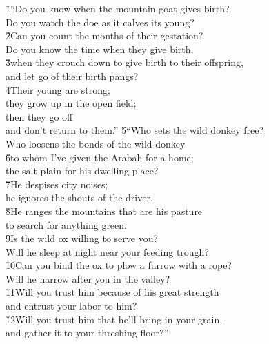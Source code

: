 \begin{poetry}
\poeml {}
\v{1}``Do you know when the mountain goat gives birth? \\
\poemll    Do you watch the doe as it calves its young? \\
\poeml \v{2}Can you count the months of their gestation? \\
\poemll    Do you know the time when they give birth, \\
\poeml \v{3}when they crouch down to give birth to their offspring, \\
\poemll    and let go of their birth pangs? \\
\poeml \v{4}Their young are strong; \\
\poemll    they grow up in the open field; \\
\poeml then they go off \\
\poemll    and don't return to them.''
\poeml \v{5}``Who sets the wild donkey free? \\
\poemll    Who loosens the bonds of the wild donkey \\
\poeml \v{6}to whom I've given the Arabah for a home; \\
\poemll    the salt plain for his dwelling place? \\
\poeml \v{7}He despises city noises; \\
\poemll    he ignores the shouts of the driver. \\
\poeml \v{8}He ranges the mountains that are his pasture \\
\poemll    to search for anything green. \\
\poeml \v{9}Is the wild ox willing to serve you? \\
\poemll    Will he sleep at night near your feeding trough? \\
\poeml \v{10}Can you bind the ox to plow a furrow with a rope? \\
\poemll    Will he harrow after you in the valley? \\
\poeml \v{11}Will you trust him because of his great strength \\
\poemll    and entrust your labor to him? \\
\poeml \v{12}Will you trust him that he'll bring in your grain, \\
\poemll    and gather it to your threshing floor?''

\end{poetry}
